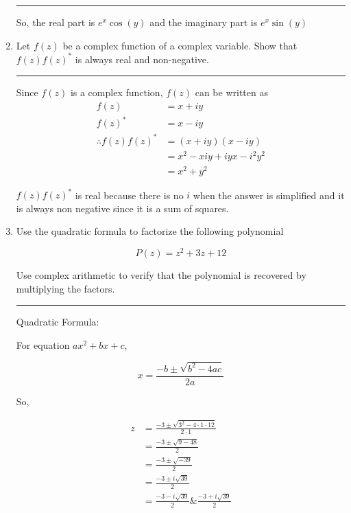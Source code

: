 \documentclass[12pt, oneside]{article}
\newenvironment{answer}
  {\vspace*{0.2cm} \rule{12cm}{0.02cm} \vspace*{0.2cm}}
  {\vspace*{0.2cm}}
\begin{document}
\begin{enumerate}
\begin{answer}
      So, the real part is $e^{x}\cos(y)$ and the imaginary part is $e^{x}\sin(y)$
    \end{answer}

  \item Let $f(z)$ be a complex function of a complex variable. Show that $f(z)f(z)^*$ is always real and non-negative.

    \begin{answer}

      Since $f(z)$ is a complex function, $f(z)$ can be written as
        \begin{align*}
          f(z) &= x + iy \\
          f(z)^* &= x - iy\\
          \therefore f(z)f(z)^* & = (x + iy)(x - iy)\\
          &= x^2 -xiy +iyx -i^2y^2 \\
          &= x^2 +y^2
        \end{align*}

    $f(z)f(z)^*$ is real because there is no $i$ when the answer is simplified and it is always non negative since it is a sum of squares.

    \end{answer}

  \item Use the quadratic formula to factorize the following polynomial

  \begin{equation*}
    P(z) = z^2 + 3z + 12
  \end{equation*}


  Use complex arithmetic to verify that the polynomial is recovered by multiplying the factors.

    \begin{answer}

      Quadratic Formula:

      For equation $ax^2 + bx + c$,

      \begin{equation*}
        x = \frac{-b \pm \sqrt{b^2 - 4ac}}{2a}
      \end{equation*}

      So,

      \begin{align*}
        z &= \frac{-3 \pm \sqrt{3^2 - 4\cdot1\cdot12}}{2\cdot1} \\
          &= \frac{-3 \pm \sqrt{9 - 48}}{2}\\
          &= \frac{-3 \pm \sqrt{-39}}{2}\\
          &= \frac{-3 \pm i\sqrt{39}}{2}\\
          &= \frac{-3 - i\sqrt{39}}{2} \& \frac{-3 + i\sqrt{39}}{2}
      \end{align*}


\end{answer}
\end{enumerate}
\end{document}
